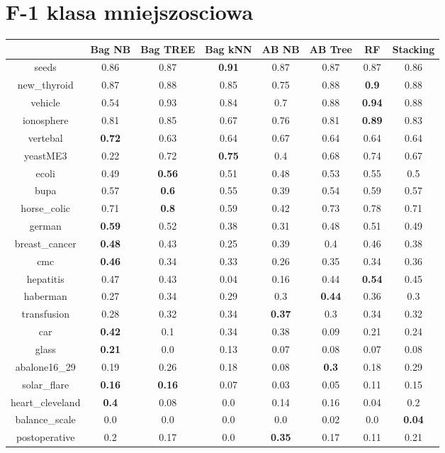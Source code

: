 \documentclass{article}%
\begin{document}
%
\section*{F{-}1 klasa mniejszosciowa}%
\begin{tabular}{c|ccccccc}%
&Bag NB&Bag TREE&Bag kNN&AB NB&AB Tree&RF&Stacking\\%
\hline%
seeds&0.86&0.87&\textbf{0.91}&0.87&0.87&0.87&0.86\\%
new\_thyroid&0.87&0.88&0.85&0.75&0.88&\textbf{0.9}&0.88\\%
vehicle&0.54&0.93&0.84&0.7&0.88&\textbf{0.94}&0.88\\%
ionosphere&0.81&0.85&0.67&0.76&0.81&\textbf{0.89}&0.83\\%
vertebal&\textbf{0.72}&0.63&0.64&0.67&0.64&0.64&0.64\\%
yeastME3&0.22&0.72&\textbf{0.75}&0.4&0.68&0.74&0.67\\%
ecoli&0.49&\textbf{0.56}&0.51&0.48&0.53&0.55&0.5\\%
bupa&0.57&\textbf{0.6}&0.55&0.39&0.54&0.59&0.57\\%
horse\_colic&0.71&\textbf{0.8}&0.59&0.42&0.73&0.78&0.71\\%
german&\textbf{0.59}&0.52&0.38&0.31&0.48&0.51&0.49\\%
breast\_cancer&\textbf{0.48}&0.43&0.25&0.39&0.4&0.46&0.38\\%
cmc&\textbf{0.46}&0.34&0.33&0.26&0.35&0.34&0.36\\%
hepatitis&0.47&0.43&0.04&0.16&0.44&\textbf{0.54}&0.45\\%
haberman&0.27&0.34&0.29&0.3&\textbf{0.44}&0.36&0.3\\%
transfusion&0.28&0.32&0.34&\textbf{0.37}&0.3&0.34&0.32\\%
car&\textbf{0.42}&0.1&0.34&0.38&0.09&0.21&0.24\\%
glass&\textbf{0.21}&0.0&0.13&0.07&0.08&0.07&0.08\\%
abalone16\_29&0.19&0.26&0.18&0.08&\textbf{0.3}&0.18&0.29\\%
solar\_flare&\textbf{0.16}&\textbf{0.16}&0.07&0.03&0.05&0.11&0.15\\%
heart\_cleveland&\textbf{0.4}&0.08&0.0&0.14&0.16&0.04&0.2\\%
balance\_scale&0.0&0.0&0.0&0.0&0.02&0.0&\textbf{0.04}\\%
postoperative&0.2&0.17&0.0&\textbf{0.35}&0.17&0.11&0.21\\%
\end{tabular}

%
\end{document}
